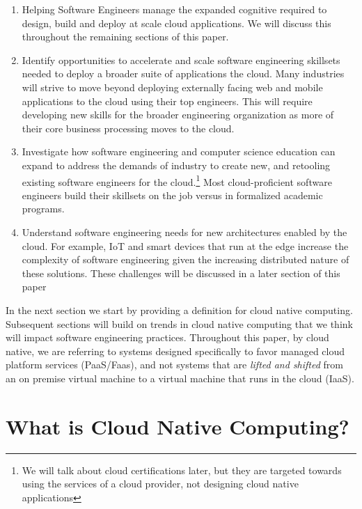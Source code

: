 \documentclass[conference]{IEEEconf}
\begin{document}
\begin{enumerate}
	\item Helping Software Engineers manage the expanded cognitive required to design, build and deploy at scale cloud applications. We will discuss this throughout the remaining sections of this paper. 
	
	\item Identify opportunities to accelerate and scale software engineering skillsets needed to deploy a broader suite of applications the cloud. Many industries will strive to move beyond deploying externally facing web and mobile applications to the cloud using their top engineers. This will require developing new skills for the broader engineering organization as more of their core business processing moves to the cloud.
	
	\item Investigate how software engineering and computer science education can expand to address the demands of industry to create new, and retooling existing software engineers for the cloud.\footnote{We will talk about cloud certifications later, but they are targeted towards using the services of a cloud provider, not designing cloud native applications} Most cloud-proficient software engineers build their skillsets on the job versus in formalized academic programs. 
	
	\item Understand software engineering needs for new architectures enabled by the cloud.  For example, IoT and smart devices that run at the edge increase the complexity of software engineering given the increasing distributed nature of these solutions.  These challenges will be discussed in a later section of this paper
\end{enumerate}

In the next section we start by providing a definition for cloud native computing. Subsequent sections will build on trends in cloud native computing that we think will impact software engineering practices.  Throughout this paper, by cloud native, we are referring to systems designed specifically to favor managed cloud platform services (PaaS/Faas)\cite{albuquerque2017function}, and not systems that are \textit{lifted and shifted}\cite{CloudMigration2017} from an on premise virtual machine to a virtual machine that runs in the cloud (IaaS). 


\section{What is Cloud Native Computing?}
\label{sec:WhatIsCNF}
\end{document}
